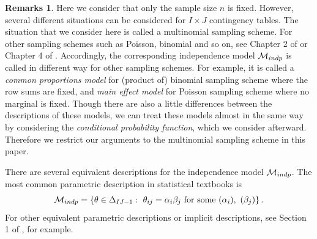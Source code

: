 \documentclass[12pt]{article}
\theoremstyle{definition}
\newtheorem{Remarks}[Theorem]{Remarks}
\let\phi=\varphi
\def\Btheta{{\bf \theta}}
\begin{document}
\begin{Remarks}
Here we consider that only the sample size $n$ is
 fixed. However, several different situations can be considered for
 $I\times J$ contingency tables. The situation that we consider here is
 called a multinomial sampling scheme. For other sampling schemes such
 as Poisson, binomial and so on, see 
Chapter 2 of \cite{Agresti-2013} or Chapter 4 of \cite{dojo-en}. 
Accordingly, 
the corresponding independence model ${\cal M}_{indp}$ is called in
 different way for
 other sampling schemes. For example, it is called a {\it common
 proportions model} for (product of) binomial sampling scheme where the
 row sums are fixed, and {\it
 main effect model} for Poisson sampling scheme where no marginal is
 fixed. Though there are also a little
 differences between the descriptions of these models, we can treat
 these models almost in the same way by considering the {\it conditional
 probability function}, which we consider afterward. Therefore we
 restrict our arguments to the multinomial sampling scheme in this paper.
\end{Remarks}

There are several equivalent descriptions for the independence model
${\cal M}_{indp}$. The most common 
parametric description in statistical textbooks is 
\begin{equation}
 {\cal M}_{indp} = \left\{\Btheta \in \Delta_{IJ-1}:\ 
\theta_{ij} =
      \alpha_{i}\beta_{j}\ {\rm for\ some}\ (\alpha_i),\ (\beta_j)
\right\}.
\label{eqn:parametric-description}
\end{equation}
For other equivalent parametric descriptions or implicit
descriptions, see Section 1 of \cite{Pacher-Sturmfels}, for example.
%
\end{document}
